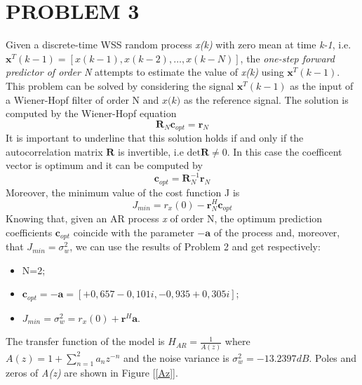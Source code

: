 \documentclass[a4paper,11pt,openright,twoside]{report}
\begin{document}
\section*{PROBLEM 3}
Given a discrete-time WSS random process \textit{x(k)} with zero mean at time \textit{k-1}, i.e. $\mathbf{x}^T(k-1) = [x(k-1), x(k-2), \dots, x(k-N)] $, the \textit{one-step forward predictor of order N} attempts to estimate the value of \textit{x(k)} using $\mathbf{x}^T(k-1)$. This problem can be solved by considering the signal $\mathbf{x}^T(k-1)$ as the input of a Wiener-Hopf filter of order N and $\textit{x(k)}$ as the reference signal. The solution is computed by the Wiener-Hopf equation 
\begin{equation*}
\mathbf{R}_N\mathbf{c}_{opt} = \mathbf{r}_N
\end{equation*}
It is important to underline that this solution holds if and only if the autocorrelation matrix $\mathbf{R}$ is invertible, i.e $\text{det}\mathbf{R}\ne0$. In this case the coefficent vector is optimum and it can be computed by
\begin{equation*}
\mathbf{c}_{opt} = \mathbf{R}^{-1}_N\mathbf{r}_N
\end{equation*}
Moreover, the minimum value of the cost function J is
\begin{equation*}
J_{min} = r_x(0)-\mathbf{r}_N^H\mathbf{c}_{opt}
\end{equation*}
Knowing that, given an AR process \textit{x} of order N, the optimum prediction coefficients $\mathbf{c}_{opt}$ coincide with the parameter $-\mathbf{a}$ of the process and, moreover, that $J_{min}=\sigma_w^2$, we can use the results of Problem 2 and get respectively:

\begin{itemize}
	\item N=2;
	\item $\mathbf{c}_{opt} = - \mathbf{a} = [+0,657 - 0,101i, -0,935 + 0,305i]$; 
	\item $J_{min}= \sigma_w^2 = r_x(0)+\mathbf{r}^H\mathbf{a}$.
\end{itemize}

The transfer function of the model is $H_{AR}=\frac{1}{A(z)}$ where $A(z)= 1+\sum_{n=1}^{2}a_nz^{-n}$ and the noise variance is $\sigma_w^2=-13.2397 dB$. Poles and zeros of \textit{A(z)} are shown in Figure [\ref{Az}].
\end{document}
